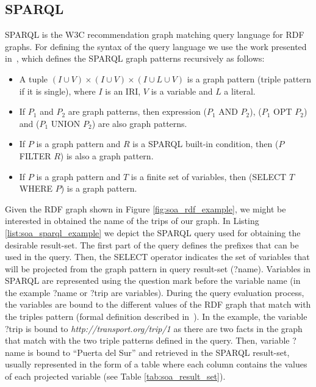 \subsection{SPARQL}
SPARQL is the W3C recommendation graph matching query language for RDF graphs. For defining the syntax of the query language we use the work presented in~\citep{perez2009semantics}, which defines the SPARQL graph patterns recursively as follows:
\begin{itemize}
    \item A tuple $(I \cup V) \times (I \cup V) \times (I \cup L \cup V)$ is a graph pattern (triple pattern if it is single), where $I$ is an IRI, $V$ is a variable and $L$ a literal.
    \item If $P_1$ and $P_2$ are graph patterns, then expression ($P_1$ AND $P_2$), ($P_1$ OPT $P_2$) and ($P_1$ UNION $P_2$) are also graph patterns.
    \item If $P$ is a graph pattern and $R$ is a SPARQL built-in condition, then ($P$ FILTER $R$) is also a graph pattern.
    \item If $P$ is a graph pattern and $T$ is a finite set of variables, then (SELECT $T$ WHERE $P$) is a graph pattern.
\end{itemize}

Given the RDF graph shown in Figure \ref{fig:soa_rdf_example}, we might be interested in obtained the name of the trips of our graph. In Listing \ref{list:soa_sparql_example} we depict the SPARQL query used for obtaining the desirable result-set. The first part of the query defines the prefixes that can be used in the query. Then, the SELECT operator indicates the set of variables that will be projected from the graph pattern in query result-set (?name). Variables in SPARQL are represented using the question mark before the variable name (in the example ?name or ?trip are variables). During the query evaluation process, the variables are bound to the different values of the RDF graph that match with the triples pattern (formal definition described in~\citep{perez2009semantics}). In the example, the variable ?trip is bound to \textit{http://transport.org/trip/1 } as there are two facts in the graph that match with the two triple patterns defined in the query. Then, variable ?name is bound to ``Puerta del Sur'' and retrieved in the SPARQL result-set, usually represented in the form of a table where each column contains the values of each projected variable (see Table \ref{tab:soa_result_set}).




